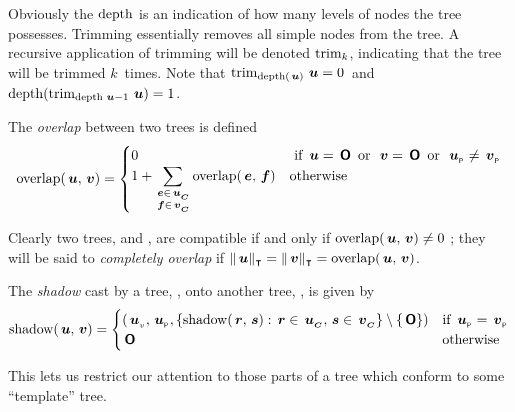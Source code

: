 Obviously the $\depth$ is an indication of how many levels of nodes
the tree possesses. Trimming essentially removes all simple nodes from the tree.
 A recursive application
of trimming will be denoted \(\trim_{k}\), indicating that the tree
 will be trimmed \(k\)\ times. Note that
\(\trim_{\depth(\node{u})}{\node{u}} = 0\)\ and
\(\depth(\trim_{\depth{\node{u}}-1}{\node{u}}) = 1\).

\begin{definition}
The \emph{overlap} between two trees is defined
\[
  \overlap(\node{u},\node{v}) = \begin{cases}
    0 & \text{ if } \node{u} = \zerotree \mor \node{v} = \zerotree \mor \nlabel{u} \neq \nlabel{v} \\
    1 + \displaystyle\sum_{\substack{\node{e}\in\child{u} \\ \node{f}\in\child{v}}} \overlap(\node{e},\node{f}) & \text{otherwise}
  \end{cases}
\]

Clearly two trees,  and , are compatible if and only if \(\overlap(\node{u},\node{v}) \neq 0 \) ; they will
be said to \emph{completely overlap} if \(\Tcard{\node{u}} = \Tcard{\node{v}} =
\overlap(\node{u},\node{v})\).
\end{definition}

\begin{definition}
The \emph{shadow} cast by a tree, , onto another tree,
, is given by
\[
\shadow(\node{u},\node{v}) = \begin{cases}
  \left(\nv{u},\nlabel{u},\{\shadow(\node{r},\node{s}):\node{r}\in\child{u},\node{s}\in\child{v}\}\setminus\{\zerotree\}\right)&\text{if~}\nlabel{u}=\nlabel{v}\\
  \zerotree&\text{otherwise}
\end{cases}
\]
\end{definition}
This lets us restrict our attention to those parts of a tree which
conform to some ``template'' tree.  

